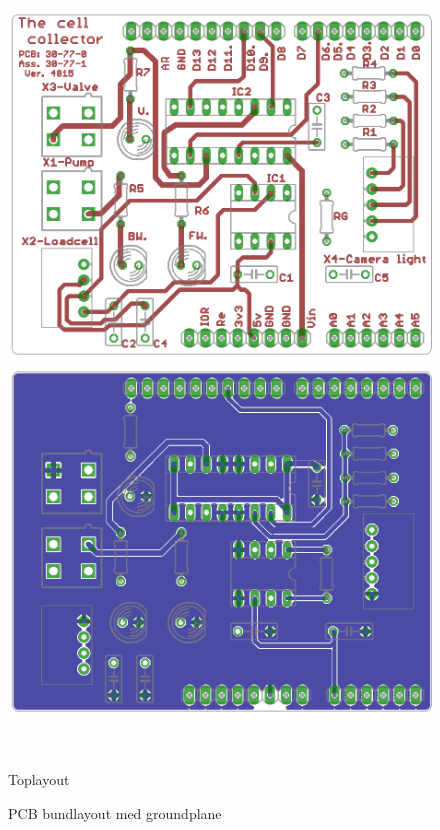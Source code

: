  \begin{figure}[H] \centering
\begin{minipage}[b]{0.48\textwidth} \centering
\includegraphics[width=1.00\textwidth]{billeder/Hovedrapport/Toplayout.png} %
\end{minipage} \hfill
\begin{minipage}[b]{0.48\textwidth} \centering
\includegraphics[width=1.00\textwidth]{billeder/Hovedrapport/Bundlayout.png} %
\end{minipage} \\ %
\begin{minipage}[b]{0.48\textwidth}
\caption{Toplayout} %
\label{fig:PCB toplayout}
\end{minipage} \hfill
\begin{minipage}[b]{0.48\textwidth}
\caption{PCB bundlayout med groundplane} %
\label{fig:PCB bundlayout med groundplane}
\end{minipage}
\end{figure}

